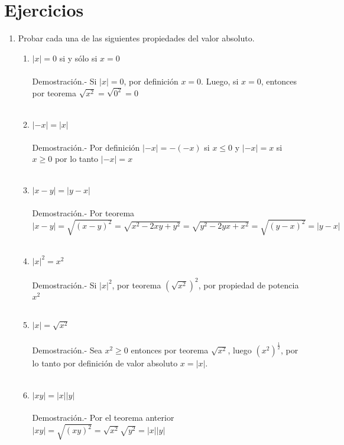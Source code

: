 \section{Ejercicios}
\begin{enumerate}[ \bfseries 1.]
\item Probar cada una de las siguientes propiedades del valor absoluto.\\
\begin{enumerate}[\bfseries (a)]
\item $|x|=0$ si y sólo si $x=0$\\\\
Demostración.- \; Si $|x|=0$, por definición $x=0$. Luego, si $x=0$, entonces por teorema $\sqrt{x^2}=\sqrt{0^2}=0$\\\\

\item $|-x|=|x|$\\\\
Demostración.- \; Por definición $|-x|=-(-x)$ si $x\leq 0$ y $|-x|=x$ si $x\geq 0$ por lo tanto $|-x|=x$\\\\ 

\item $|x-y|=|y-x|$\\\\
Demostración.- \; Por teorema $|x-y|=\sqrt{(x-y)^2}=\sqrt{x^2-2xy+y^2}=\sqrt{y^2-2yx+x^2}=\sqrt{(y-x)^2}=|y-x|$\\\\ 

\item $|x|^2=x^2$\\\\
Demostración.- \; Si $|x|^2$, por teorema $\left( \sqrt{x^2} \right)^2$, por propiedad de potencia $x^2$\\\\

\item $|x|=\sqrt{x^2}$\\\\
Demostración.- \; Sea $x^2\geq 0$ entonces por teorema $\sqrt{x^2}$, luego $(x^2)^{\frac{1}{2}}$, por lo tanto por definición de valor absoluto $x=|x|$.\\\\ 

\item $|xy|=|x||y|$\\\\
Demostración.- \; Por el teorema anterior $|xy|=\sqrt{(xy)^2}=\sqrt{x^2} \sqrt{y^2} = |x||y|$\\\\ 


\end{enumerate}
\end{enumerate}
